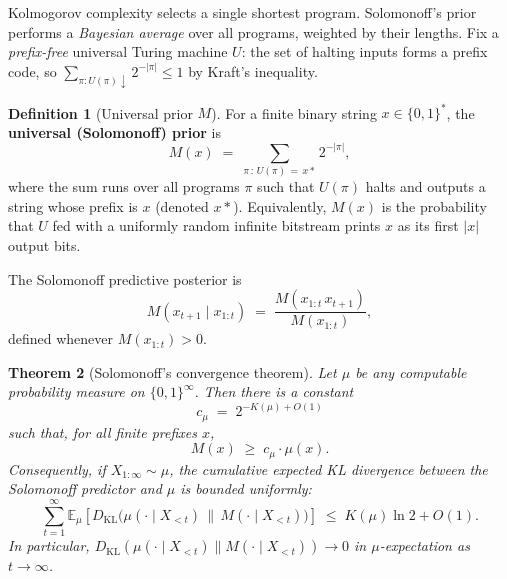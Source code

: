 \documentclass[12pt,a4paper]{article}
\theoremstyle{plain}
\newtheorem{theorem}{Theorem}[section]
\theoremstyle{definition}
\newtheorem{definition}[theorem]{Definition}
\begin{document}
Kolmogorov complexity selects a single shortest program.  Solomonoff's
prior \citep{solomonoff1964formal} performs a \emph{Bayesian average}
over all programs, weighted by their lengths.  Fix a
\emph{prefix-free} universal Turing machine $U$: the set of halting
inputs forms a prefix code, so
$\sum_{\pi : U(\pi)\downarrow} 2^{-|\pi|} \le 1$ by Kraft's inequality.

\begin{definition}[Universal prior $M$]
\label{def:M}
For a finite binary string $x \in \{0,1\}^*$, the \textbf{universal
(Solomonoff) prior} is
\begin{equation}
  M(x) \;=\; \sum_{\pi \,:\, U(\pi)\, =\, x *} 2^{-|\pi|},
  \label{eq:M}
\end{equation}
where the sum runs over all programs $\pi$ such that $U(\pi)$ halts
and outputs a string whose prefix is $x$ (denoted $x*$).
Equivalently, $M(x)$ is the probability that $U$ fed with a uniformly
random infinite bitstream prints $x$ as its first $|x|$ output bits.
\end{definition}

The Solomonoff predictive posterior is
\begin{equation}
  M(x_{t+1} \mid x_{1:t}) \;=\; \frac{M(x_{1:t}\,x_{t+1})}{M(x_{1:t})},
  \label{eq:M-posterior}
\end{equation}
defined whenever $M(x_{1:t}) > 0$.

\begin{theorem}[Solomonoff's convergence theorem]
\label{thm:solomonoff}
Let $\mu$ be any computable probability measure on $\{0,1\}^\infty$.
Then there is a constant
\begin{equation}
  c_\mu \;=\; 2^{-K(\mu) + O(1)}
  \label{eq:cmu}
\end{equation}
such that, for all finite prefixes $x$,
\begin{equation}
  M(x) \;\ge\; c_\mu \cdot \mu(x).
  \label{eq:dominance}
\end{equation}
Consequently, if $X_{1:\infty} \sim \mu$, the cumulative expected
KL divergence between the Solomonoff predictor and $\mu$ is bounded
uniformly:
\begin{equation}
  \sum_{t=1}^{\infty}
    \mathbb{E}_{\mu}\!\left[
      D_{\mathrm{KL}}\!\bigl(\mu(\cdot \mid X_{<t}) \,\|\, M(\cdot \mid X_{<t})\bigr)
    \right]
  \;\le\; K(\mu)\ln 2 + O(1).
  \label{eq:sol-bound}
\end{equation}
In particular,
$D_{\mathrm{KL}}(\mu(\cdot \mid X_{<t}) \| M(\cdot \mid X_{<t})) \to 0$
in $\mu$-expectation as $t \to \infty$.
\end{theorem}
\end{document}
